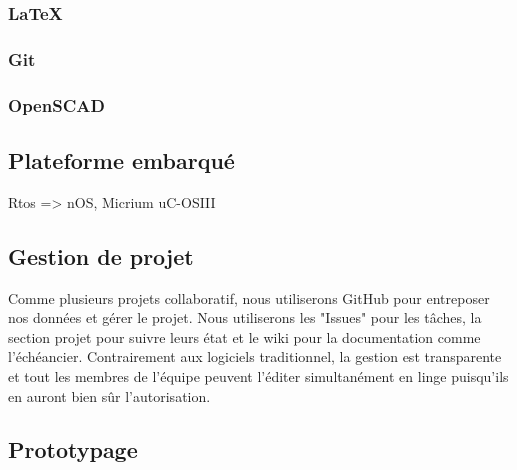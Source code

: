 \subsubsection{LaTeX}


\subsubsection{Git}


\subsubsection{OpenSCAD}



\subsection{Plateforme embarqué}
Rtos => nOS, Micrium uC-OSIII
\subsection{Gestion de projet}
Comme plusieurs projets collaboratif, nous utiliserons GitHub pour entreposer nos données et gérer le projet. Nous utiliserons les "Issues" pour les tâches, la section projet pour suivre leurs état et le wiki pour la documentation comme l'échéancier. Contrairement aux logiciels traditionnel, la gestion est transparente et tout les membres de l'équipe peuvent l'éditer simultanément en linge puisqu'ils en auront bien sûr l'autorisation. 
\subsection{Prototypage}

\subsection{}
\subsection{}
\subsection{}

